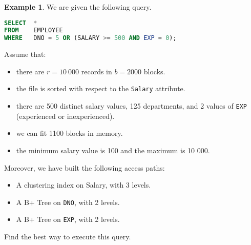 \documentclass[a4paper, openany]{memoir}
\theoremstyle{definition}
\newtheorem{example}[subsection]{Example}
\begin{document}
\newpage

\begin{example}
    We are given the following query.
\begin{lstlisting}[language=SQL]
SELECT  *
FROM    EMPLOYEE
WHERE   DNO = 5 OR (SALARY >= 500 AND EXP = 0);
\end{lstlisting}
    Assume that:
    \begin{itemize}
        \item there are $r = 10 \ 000$ records in $b = 2000$ blocks.
        \item the file is sorted with respect to the \texttt{Salary} attribute.
        \item there are 500 distinct salary values, 125 departments, and 2 values of \texttt{EXP} (experienced or inexperienced). 
        \item we can fit 1100 blocks in memory.
        \item the minimum salary value is 100 and the maximum is 10 000.
    \end{itemize}
    Moreover, we have built the following access paths:
    \begin{itemize}
        \item A clustering index on Salary, with 3 levels.
        \item A B+ Tree on \texttt{DNO}, with 2 levels.
        \item A B+ Tree on \texttt{EXP}, with 2 levels.
    \end{itemize}
    Find the best way to execute this query.
\end{example}
\end{document}
